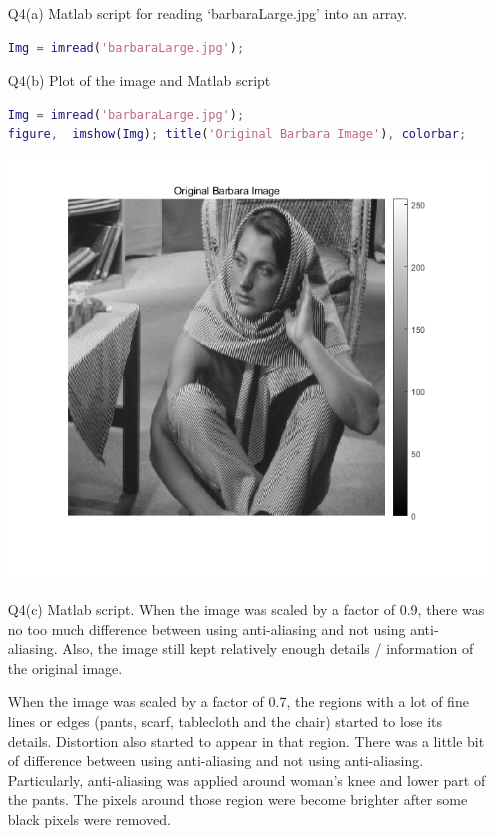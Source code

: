 \documentclass{article}
\begin{document}
\begin{enumerate}

\item[Q4(a)] Matlab script for reading `barbaraLarge.jpg' into an array. 
\begin{lstlisting}[language=Matlab]
Img = imread('barbaraLarge.jpg');
\end{lstlisting}

\item[Q4(b)] Plot of the image and Matlab script
\begin{lstlisting}[language=Matlab]
Img = imread('barbaraLarge.jpg');
figure,  imshow(Img); title('Original Barbara Image'), colorbar;
\end{lstlisting}

\includegraphics[width=\textwidth]{og.png}
 
\item[Q4(c)] Matlab script. When the image was scaled by a factor of 0.9, there was 
no too much difference between using anti-aliasing and not using anti-aliasing. Also, 
the image still kept relatively enough details / information of the original image. 

When the image was scaled by a factor of 0.7, the regions with a lot of fine lines 
or edges (pants, scarf, tablecloth and the chair) started to lose its details. 
Distortion also started to appear in that region. There was a little bit of 
difference between using anti-aliasing and not using anti-aliasing. Particularly, 
anti-aliasing was applied around woman's knee and lower part of the pants. The 
pixels around those region were become brighter after some black pixels were removed.


\end{enumerate}
\end{document}
